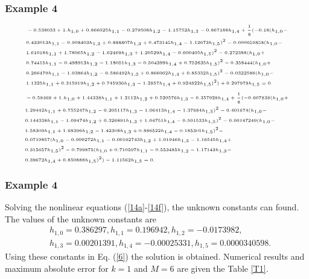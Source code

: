 \documentclass{beamer}
\begin{document}
\begin{frame}\frametitle{Example 4}
	\justifying
	\begin{equation}\label{14e}
	\tiny
	\begin{aligned}
	&-0.538033+1. h_{1,0}+0.866025 h_{1,1}-0.279508 h_{1,2}-1.15752 h_{1,3}-0.867188 h_{1,4}+\frac{1}{8}(-0.18(h_{1,0}-\\
	&0.433013 h_{1,1}-0.908403 h_{1,2}+0.888807 h_{1,3}+0.473145 h_{1,4}-1.12673 h_{1,5})^{2}-0.000659858(h_{1,0}-\\
	&1.61018 h_{1,1}+1.78065 h_{1,2}-1.62469 h_{1,3}+1.20529 h_{1,4}-0.600405 h_{1,5})^{2}-0.272388(h_{1,0}+\\
	&0.74415 h_{1,1}-0.498913 h_{1,2}-1.18051 h_{1,3}-0.504399 h_{1,4}+0.752635 h_{1,5})^{2}-0.358444( h_{1,0}+\\
	&0.266479 h_{1,1}-1.03864 h_{1,2}-0.586492 h_{1,3}+0.866062 h_{1,4}+0.85332 h_{1,5})^{2}-0.0322586(h_{1,0}-\\
	&1.1325 h_{1,1}+0.315919 h_{1,2}+0.745936 h_{1,3}-1.2857 h_{1,4}+0.924822 h_{1,5})^{2})+0.297978 h_{1,5}=0.
	\end{aligned}
	\end{equation}
	\begin{equation}\label{14f}
	\tiny
	\begin{aligned}
	&-0.58468+1. h_{1,0}+1.44338 h_{1,1}+1.2112 h_{1,2}+0.520576 h_{1,3}-0.357928 h_{1,4}+\frac{1}{8}(-0.607838(h_{1,0}+\\
	&1.29442 h_{1,1}+0.755247 h_{1,2}-0.205117 h_{1,3}-1.06413 h_{1,4}-1.37684 h_{1,5})^{2}-0.401674(h_{1,0}-\\
	&0.144338 h_{1,1}-1.09474 h_{1,2}+0.326891 h_{1,3}+1.04751 h_{1,4}-0.501533 h_{1,5})^{2}-0.00147249(h_{1,0}-\\
	&1.58309 h_{1,1}+1.68396 h_{1,2}-1.42308 h_{1,3}+0.886522 h_{1,4}-0.185301 h_{1,5})^{2}-\\
	&0.0719857( h_{1,0}-0.999272 h_{1,1}-0.00162743 h_{1,2}+1.01946 h_{1,3}-1.16545 h_{1,4}+\\
	&0.315657 h_{1,5})^{2}-0.799875(h_{1,0}+0.710597 h_{1,1}-0.553485 h_{1,2}-1.17143 h_{1,3}-\\
	&0.39672 h_{1,4}+0.850888 h_{1,5})^{2})-1.11562 h_{1,5}=0.
	\end{aligned}
	\end{equation}
\end{frame}
\begin{frame}\frametitle{Example 4}
	\justifying
Solving the nonlinear equations (\ref{14a}-\ref{14f}), the unknown constants can found. The values of the unknown constants are
\begin{align}
& h_{1,0}= 0.386297, h_{1,1}= 0.196942, h_{1,2}= -0.0173982,\nonumber\\
& h_{1,3}= 0.00201391, h_{1,4}= -0.00025331, h_{1,5}= 0.0000340598.\nonumber
\end{align} 
Using these constants in Eq. (\ref{6}) the solution is obtained. Numerical results and maximum absolute error for $k=1$ and $M=6$ are given the Table \ref{T1}.
\end{frame}
\end{document}
